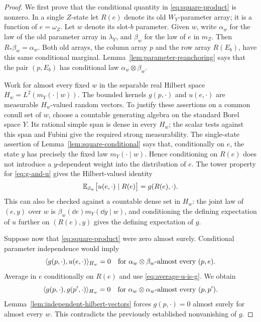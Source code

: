 \begin{proof}
We first prove that the conditional quantity in
\eqref{eq:square-product} is nonzero. In a single $Z$-state let $R(e)$
denote its old $W_Y$-parameter array; it is a function of $e=\omega_Z$.
Let $w$ denote its slot-$b$ parameter. Given $w$, write $\alpha_w$ for
the law of the old parameter array in $\lambda_Y$, and $\beta_w$ for
the law of $e$ in $m_Z$. Then $R_*\beta_w=\alpha_w$. Both old arrays,
the column array $p$ and the row array $R(E_b)$, have this same
conditional marginal. Lemma~\ref{lem:parameter-reanchoring} says that
the pair $(p,E_b)$ has conditional law $\alpha_w\otimes\beta_w$.

Work for almost every fixed $w$ in the separable real Hilbert space
$H_w=L^2(m_Y(\cdot\mid w))$. The bounded kernels
$g(p,\cdot)$ and $u(e,\cdot)$ are measurable $H_w$-valued random
vectors. To justify these assertions on a common conull set of $w$,
choose a countable generating algebra on the standard Borel space $Y$.
Its rational simple span is dense in every $H_w$; the scalar tests
against this span and Fubini give the required strong measurability.
The single-state assertion of
Lemma~\ref{lem:square-conditional} says that, conditionally on $e$,
the state $y$ has precisely the fixed law $m_Y(\cdot\mid w)$. Hence
conditioning on $R(e)$ does not introduce a $y$-dependent weight into
the distribution of $e$. The tower property for
\eqref{eq:g-and-u} gives the Hilbert-valued identity
\begin{equation}\label{eq:average-u-is-g}
 \mathbb E_{\beta_w}\bigl[u(e,\cdot)\mid R(e)\bigr]
       =g(R(e),\cdot).
\end{equation}
This can also be checked against a countable dense set in $H_w$:
the joint law of $(e,y)$ over $w$ is
$\beta_w(\dd e)m_Y(\dd y\mid w)$, and conditioning the defining
expectation of $u$ further on $(R(e),y)$ gives the defining expectation
of $g$.

Suppose now that \eqref{eq:square-product} were zero almost surely.
Conditional parameter independence would imply
\[
 \langle g(p,\cdot),u(e,\cdot)\rangle_{H_w}=0
 \quad\text{for }\alpha_w\otimes\beta_w\text{-almost every }(p,e).
\]
Average in $e$ conditionally on $R(e)$ and use
\eqref{eq:average-u-is-g}. We obtain
\[
 \langle g(p,\cdot),g(p',\cdot)\rangle_{H_w}=0
 \quad\text{for }\alpha_w\otimes\alpha_w\text{-almost every }(p,p').
\]
Lemma~\ref{lem:independent-hilbert-vectors} forces
$g(p,\cdot)=0$ almost surely for almost every $w$. This contradicts
the previously established nonvanishing of $g$.


\end{proof}
